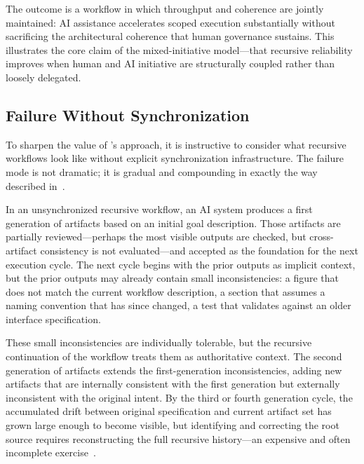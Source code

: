 The outcome is a workflow in which throughput and coherence are jointly maintained: AI assistance accelerates scoped execution substantially without sacrificing the architectural coherence that human governance sustains. This illustrates the core claim of the mixed-initiative model---that recursive reliability improves when human and AI initiative are structurally coupled rather than loosely delegated.

\subsection{Failure Without Synchronization}

To sharpen the value of 's approach, it is instructive to consider what recursive workflows look like without explicit synchronization infrastructure. The failure mode is not dramatic; it is gradual and compounding in exactly the way described in~.

In an unsynchronized recursive workflow, an AI system produces a first generation of artifacts based on an initial goal description. Those artifacts are partially reviewed---perhaps the most visible outputs are checked, but cross-artifact consistency is not evaluated---and accepted as the foundation for the next execution cycle. The next cycle begins with the prior outputs as implicit context, but the prior outputs may already contain small inconsistencies: a figure that does not match the current workflow description, a section that assumes a naming convention that has since changed, a test that validates against an older interface specification.

These small inconsistencies are individually tolerable, but the recursive continuation of the workflow treats them as authoritative context. The second generation of artifacts extends the first-generation inconsistencies, adding new artifacts that are internally consistent with the first generation but externally inconsistent with the original intent. By the third or fourth generation cycle, the accumulated drift between original specification and current artifact set has grown large enough to become visible, but identifying and correcting the root source requires reconstructing the full recursive history---an expensive and often incomplete exercise~\cite{Jimenez2024SWEBench}.

